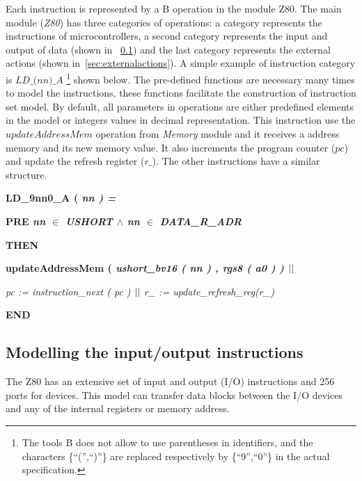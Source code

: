 \documentclass[a4paper]{llncs}
\newcommand{\footnoteremember}[2]{
  \footnote{#2}
  \newcounter{#1}
  \setcounter{#1}{\value{footnote}}
}
\begin{document}
Each instruction is represented by a B operation in the module Z80. The main
module (\textit{Z80}) has three categories of operations: a category represents the 
instructions of microcontrollers, a second category represents the input and output of data 
(shown in ~\ref{sec:modellingIO}) and the last category represents the external
actions (shown in~\ref{sec:externalactions}). A simple example of instruction category is
$\textit{LD\_(nn)\_A}$\footnoteremember{myfootnote}{The tools B does not allow
to use parentheses in identifiers, and the characters \{``('',``)''\} are
replaced respectively by \{``9'',``0''\} in the actual specification.} shown below. The
pre-defined functions are necessary many times to model the instructions, these
functions facilitate the construction of instruction set model. By default, all
parameters in operations are either predefined elements in the model or
integers values in decimal representation. This instruction use the
$\textit{updateAddressMem}$ operation from \textit{Memory} module and it receives
a address memory and its new memory value. It also increments the program
counter ($\textit{pc}$) and update the refresh register ($\textit{r\_}$).
The other instructions have a similar structure.

\hspace*{0.00in}\bf LD\_9nn0\_A \rm ( \it nn \rm ) \rm =

\hspace*{0.20in}\bf PRE \it nn $\in$ \it USHORT\hspace*{0.15in} $\land$ \hspace*{0.10in}\it nn\hspace*{0.10in} $\in$  \it DATA\_R\_ADR

\hspace*{0.20in}\bf THEN

\hspace*{0.20in}\bf updateAddressMem \rm ( \it ushort\_bv16 \rm ( \it nn \rm ) \rm , \it rgs8 \rm ( \it a0 \rm )
\rm )  $\mbox{$\mid\mid$}$

\hspace*{0.20in}\it pc \rm := \it instruction\_next \rm ( \it pc \rm )  $\mbox{$\mid\mid$}$  \it r\_ \rm := \it update\_refresh\_reg\rm (\it r\_\rm )

\hspace*{0.00in}\bf END\rm 



\subsection{Modelling the input/output instructions}
\label{sec:modellingIO}
The Z80 has an extensive set of input and output (I/O) instructions and 256 ports for
devices. This model can transfer data blocks between the I/O devices and any
of the internal registers or memory address.
\end{document}
